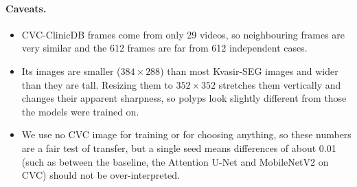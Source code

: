\paragraph{Caveats.}
\begin{itemize}
  \item CVC-ClinicDB frames come from only 29 videos, so neighbouring frames are very similar and the 612 frames are
        far from 612 independent cases.
  \item Its images are smaller ($384\times288$) than most Kvasir-SEG images and wider than they are tall. Resizing them to
        $352\times352$ stretches them vertically and changes their apparent sharpness, so polyps look slightly different
        from those the models were trained on.
  \item We use no CVC image for training or for choosing anything, so these numbers are a fair test of transfer, but a
        single seed means differences of about 0.01 (such as between the baseline, the Attention U-Net and MobileNetV2
        on CVC) should not be over-interpreted.
\end{itemize}
